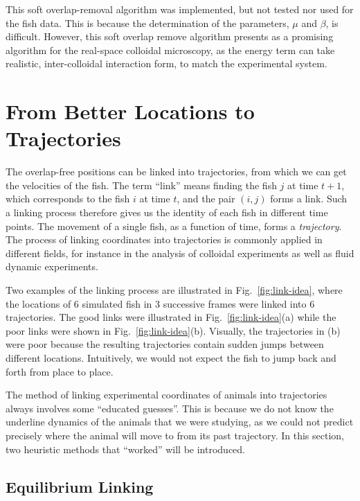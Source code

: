 \documentclass[11pt,twoside]{report}
\begin{document}
This soft overlap-removal algorithm was implemented, but not tested nor used for the fish data. This is because the determination of the parameters, $\mu$ and $\beta$, is difficult. However, this soft overlap remove algorithm presents as a promising algorithm for the real-space colloidal microscopy, as the energy term can take realistic, inter-colloidal interaction form, to match the experimental system.

\section{From Better Locations to Trajectories}
\label{section:link}

The overlap-free positions can be linked into trajectories, from which we can get the velocities of the fish. The term ``link'' means finding the fish $j$ at time $t+1$, which corresponds to the fish $i$ at time $t$, and the pair $(i, j)$ forms a link.
Such a linking process therefore gives us the identity of each fish in different time points.
The movement of a single fish, as a function of time, forms a \emph{trajectory}.
The process of linking coordinates into trajectories is commonly applied in different fields, for instance in the analysis of colloidal experiments\cite{crocker1996} as well as fluid dynamic experiments\cite{ouellette2005ef}.


Two examples of the linking process are illustrated in Fig.~\ref{fig:link-idea}, where the locations of 6 simulated fish in 3 successive frames were linked into 6 trajectories. The good links were illustrated in Fig.~\ref{fig:link-idea}(a) while the poor links were shown in Fig.~\ref{fig:link-idea}(b).
Visually, the trajectories in (b) were poor because the resulting trajectories contain sudden jumps between different locations. Intuitively, we would not expect the fish to jump back and forth from place to place.

The method of linking experimental coordinates of animals into trajectories always involves some ``educated guesses''. This is because we do not know the underline dynamics of the animals that we were studying, as we could not predict precisely where the animal will move to from its past trajectory. In this section, two heuristic methods that ``worked'' will be introduced.


\subsection{Equilibrium Linking}
\label{section:link-eq}
\end{document}
